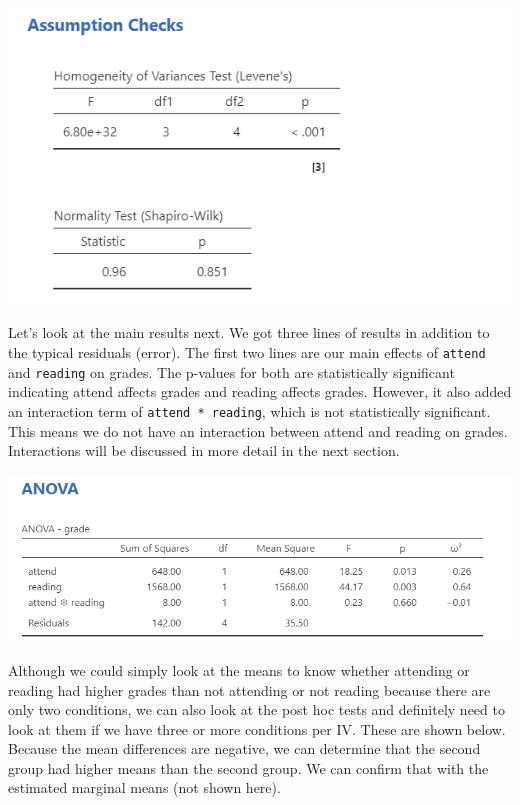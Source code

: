 \documentclass[
]{book}
\begin{document}
\includegraphics{images/06-factorial-anova/independent-factorial_assumptions.png}

Let's look at the main results next. We got three lines of results in addition to the typical residuals (error). The first two lines are our main effects of \texttt{attend} and \texttt{reading} on grades. The p-values for both are statistically significant indicating attend affects grades and reading affects grades. However, it also added an interaction term of \texttt{attend\ *\ reading}, which is not statistically significant. This means we do not have an interaction between attend and reading on grades. Interactions will be discussed in more detail in the next section.

\includegraphics{images/06-factorial-anova/independent-factorial_results.png}

Although we could simply look at the means to know whether attending or reading had higher grades than not attending or not reading because there are only two conditions, we can also look at the post hoc tests and definitely need to look at them if we have three or more conditions per IV. These are shown below. Because the mean differences are negative, we can determine that the second group had higher means than the second group. We can confirm that with the estimated marginal means (not shown here).
\end{document}

